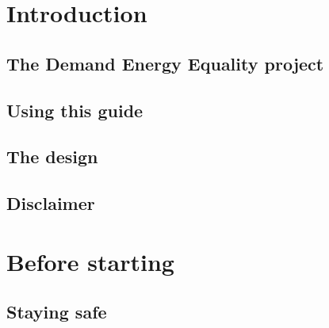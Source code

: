 \documentclass{article}
\theoremstyle{definition}
\theoremstyle{definition}
\theoremstyle{remark}
\begin{document}


\newpage

\section{Introduction} %
\label{sec:introduction}

  \subsection{The Demand Energy Equality project} %
  \label{sub:the_demand_energy_equality_project}

  
  \subsection{Using this guide} %
  \label{sub:using_this_guide}


  \subsection{The design} %
  \label{ssub:the_design}

  
  \subsection{Disclaimer} %
  \label{sub:disclaimer}


  \newpage  


\section{Before starting} %
\label{sec:before_starting}

  \subsection{Staying safe} %
  \label{sub:staying_safe}

\end{document}
